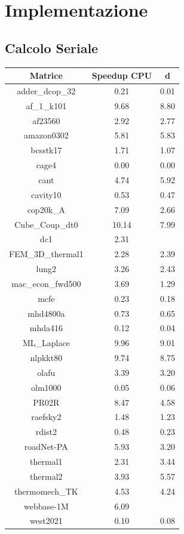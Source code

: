 \documentclass[12pt,halfline,a4paper]{ouparticle}
\begin{document}
\section{Implementazione}
\label{sec3}

\subsection{Calcolo Seriale}
\label{sec3.1}


\begin{center}
\begin{tabular}{|| c | c | c ||} 
\hline
Matrice & Speedup CPU & d \\ [1ex]
\hline
adder\_dcop\_32 & 0.21 & 0.01 \\
\hline
af\_1\_k101 & 9.68 & 8.80 \\
\hline
af23560 & 2.92 & 2.77 \\
\hline
amazon0302 & 5.81 & 5.83 \\
\hline
bcsstk17 & 1.71 & 1.07 \\
\hline
cage4 & 0.00 & 0.00 \\
\hline
cant & 4.74 & 5.92 \\
\hline
cavity10 & 0.53 & 0.47 \\
\hline
cop20k\_A & 7.09 & 2.66 \\
\hline
Cube\_Coup\_dt0 & 10.14 & 7.99 \\
\hline
dc1 & 2.31 &  \\
\hline
FEM\_3D\_thermal1 & 2.28 & 2.39 \\
\hline
lung2 & 3.26 & 2.43 \\
\hline
mac\_econ\_fwd500 & 3.69 & 1.29 \\
\hline
mcfe & 0.23 & 0.18 \\
\hline
mhd4800a & 0.73 & 0.65 \\
\hline
mhda416 & 0.12 & 0.04 \\
\hline
ML\_Laplace & 9.96 & 9.01 \\
\hline
nlpkkt80 & 9.74 & 8.75 \\
\hline
olafu & 3.39 & 3.20 \\
\hline
olm1000 & 0.05 & 0.06 \\
\hline
PR02R & 8.47 & 4.58 \\
\hline
raefsky2 & 1.48 & 1.23 \\
\hline
rdist2 & 0.48 & 0.23 \\
\hline
roadNet-PA & 5.93 & 3.20 \\
\hline
thermal1 & 2.31 & 3.44 \\
\hline
thermal2 & 3.93 & 5.57 \\
\hline
thermomech\_TK & 4.53 & 4.24 \\
\hline
webbase-1M & 6.09 &  \\
\hline
west2021 & 0.10 & 0.08 \\
\hline
\end{tabular}
\end{center}
\end{document}
